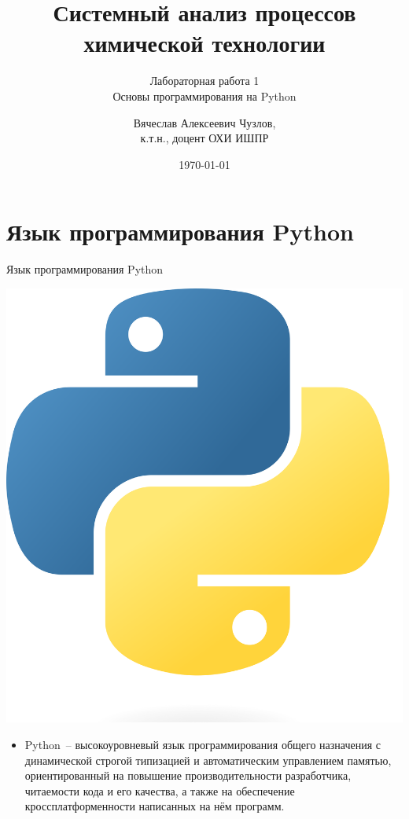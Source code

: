 \documentclass[aspectratio=169]{beamer}	%
\title{\LARGE{Системный анализ процессов химической технологии}}
\subtitle{Лабораторная работа 1 \\ Основы программирования на Python}
\author[]{Вячеслав Алексеевич Чузлов, \\
	к.т.н., доцент ОХИ ИШПР}
\date{\today}
\begin{document}

\titleframe		%

\tocframe{}		%



\section{Язык программирования Python}
\sectionframe


\begin{frame}[fragile]{Язык программирования Python}
\scriptsize
\begin{minipage}{.1\textwidth}
	\includegraphics[width=\linewidth]{./pics/Python-logo}
\end{minipage}
\begin{minipage}{.89\textwidth}
\begin{itemize}
	\item Python~-- высокоуровневый язык программирования общего назначения с динамической строгой типизацией и автоматическим управлением памятью, ориентированный на повышение производительности разработчика, читаемости кода и его качества, а также на обеспечение кроссплатформенности написанных на нём программ.
\end{itemize}
\end{minipage}


\end{frame}
\end{document}
